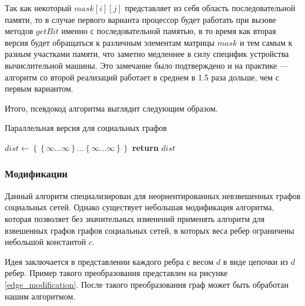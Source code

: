 Так как некоторый $mask[i][j]$ представляет из себя область последовательной памяти, то в случае первого варианта процессор будет работать при вызове методов $getBit$ именно с последовательной памятью, в то время как вторая версия будет обращаться к различным элементам матрицы $mask$ и тем самым к разным участками памяти, что заметно медленнее в силу специфик устройства вычислительной машины. Это замечание было подтверждено и на практике --- алгоритм со второй реализаций работает в среднем в 1.5 раза дольше, чем с первым вариантом.

Итого, псевдокод алгоритма выглядит следующим образом.

\FloatBarrier
\begin{algorithm}
\caption{Параллельная версия для социальных графов}\label{all_pairs_social}
\begin{algorithmic}[1]

\State $dist\gets \left\{ {   \left\{ {\infty \ldots \infty}\right\}  \ldots \left\{ {\infty \ldots \infty}\right\} }\right\}$
 
\State \textbf{return} $dist$ 
\EndProcedure

\end{algorithmic}
\end{algorithm}



\FloatBarrier
\subsubsection{Модификации}

Данный алгоритм специализирован для неориентированных невзвешенных графов социальных сетей. Однако существует небольшая модификация алгоритма, которая позволяет без значительных изменений применять алгоритм для взвешенных графов графов социальных сетей, в которых веса ребер ограничены небольшой константой $c$. 

Идея заключается в представлении каждого ребра с весом $d$ в виде цепочки из $d$ ребер. Пример такого преобразования представлен на рисунке \ref{edge_modification}. После такого преобразования граф может быть обработан нашим алгоритмом.

